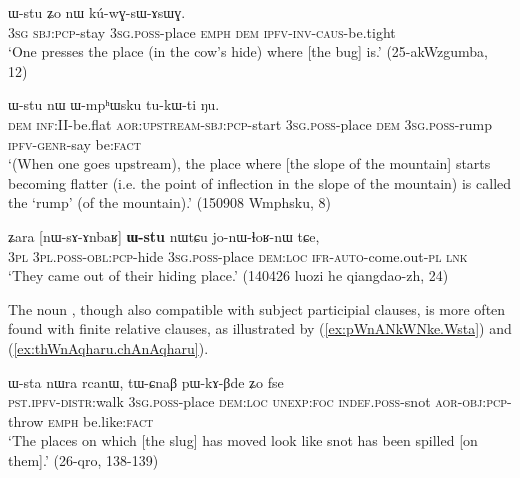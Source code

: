 \begin{exe}
\ex \label{ex:kWrAZi.Wstu}
  ɯ-stu ʑo nɯ kú-wɣ-sɯ-ɤsɯɣ. \\
\textsc{3sg} \textsc{sbj}:\textsc{pcp}-stay \textsc{3sg}.\textsc{poss}-place \textsc{emph} \textsc{dem} \textsc{ipfv}-\textsc{inv}-\textsc{caus}-be.tight \\
\glt `One presses the place (in the cow's hide) where [the bug] is.' (25-akWzgumba, 12)
\end{exe}

\begin{exe}
\ex \label{ex:tAntAm.lAkWZa.Wstu}
  ɯ-stu nɯ ɯ-mpʰɯsku tu-kɯ-ti ŋu. \\
\textsc{dem} \textsc{inf}:II-be.flat \textsc{aor}:\textsc{upstream}-\textsc{sbj}:\textsc{pcp}-start \textsc{3sg}.\textsc{poss}-place \textsc{dem} \textsc{3sg}.\textsc{poss}-rump \textsc{ipfv}-\textsc{genr}-say be:\textsc{fact} \\
\glt  `(When one goes upstream), the place where [the slope of the mountain] starts becoming flatter (i.e. the point of inflection in the slope of the mountain) is called  the `rump' (of the mountain).' (150908 Wmphsku, 8)
\end{exe}
 
\begin{exe}
\ex \label{ex:nWsAnbaR.Wstu}
 \gll ʑara [nɯ-sɤ-ɤnbaʁ] \textbf{ɯ-stu} nɯtɕu jo-nɯ-ɬoʁ-nɯ tɕe, \\
 \textsc{3pl} \textsc{3pl}.\textsc{poss}-\textsc{obl}:\textsc{pcp}-hide \textsc{3sg}.\textsc{poss}-place \textsc{dem}:\textsc{loc} \textsc{ifr}-\textsc{auto}-come.out-\textsc{pl} \textsc{lnk} \\
 \glt `They came out of their hiding place.' (140426 luozi he qiangdao-zh, 24)
\end{exe}

The noun , though also compatible with subject participial clauses, is more often found with finite relative clauses, as illustrated by  (\ref{ex:pWnANkWNke.Wsta}) and (\ref{ex:thWnAqharu.chAnAqharu}).  

\begin{exe}
\ex \label{ex:pWnANkWNke.Wsta}
 \gll  [pɯ-nɤŋkɯŋke] ɯ-sta nɯra rcanɯ, tɯ-ɕnaβ pɯ-kɤ-βde ʑo fse \\
 \textsc{pst}.\textsc{ipfv}-\textsc{distr}:walk \textsc{3sg}.\textsc{poss}-place \textsc{dem}:\textsc{loc} \textsc{unexp}:\textsc{foc} \textsc{indef}.\textsc{poss}-snot \textsc{aor}-\textsc{obj}:\textsc{pcp}-throw \textsc{emph} be.like:\textsc{fact} \\
 \glt `The places on which [the slug] has moved look like snot has been spilled  [on them].' (26-qro, 138-139)
 \end{exe}

